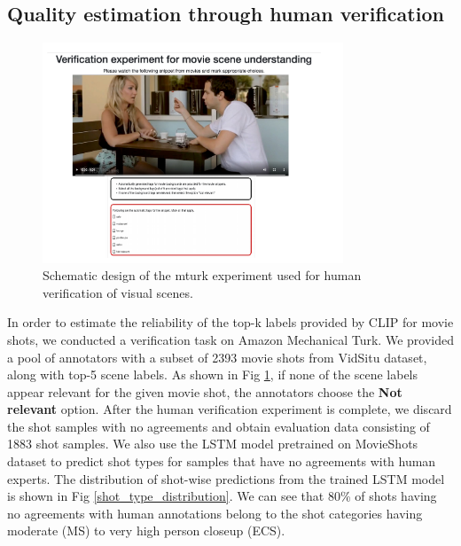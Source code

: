 \subsection{Quality estimation through human verification}
\begin{figure}[h!]
    \centering
    \includegraphics[width=0.8\textwidth]{figures/verification_experiment.pdf}
    \caption{Schematic design of the mturk experiment used for human verification of visual scenes.}
    \label{mturk experiment}
\end{figure}
In order to estimate the reliability of the top-k labels provided by CLIP for movie shots, we conducted a verification task on Amazon Mechanical Turk. We provided a pool of annotators with a subset of 2393 movie shots from VidSitu \cite{Sadhu_2021_CVPR} dataset, along with top-5 scene labels. As shown in Fig \ref{mturk experiment},  if none of the scene labels appear relevant for the given movie shot, the annotators choose the \textbf{Not relevant} option.  After the human verification experiment is complete, we discard the shot samples with no agreements and obtain evaluation data consisting of 1883 shot samples. We also use the LSTM model pretrained on MovieShots dataset to predict shot types for samples that have no agreements with human experts. The distribution of shot-wise predictions from the trained LSTM model is shown in Fig \ref{shot_type_distribution}. We can see that 80\% of shots having no agreements with human annotations belong to the shot categories having moderate (MS) to very high person closeup (ECS). 
